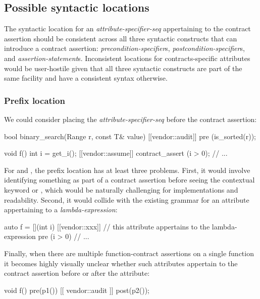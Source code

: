 \subsection{Possible syntactic locations}

The syntactic location for an \emph{attribute-specifier-seq} appertaining to the contract assertion should be consistent across all three syntactic constructs that can introduce a contract assertion: \emph{precondition-specifier}s, \emph{postcondition-specifier}s, and \emph{assertion-statement}s. Inconsistent locations for contracts-specific attributes would be user-hostile given that all three syntactic constructs are part of the same facility and have a consistent syntax otherwise.

\subsubsection{Prefix location}

We could consider placing the \emph{attribute-specifier-seq} before the contract assertion:
\begin{codeblock}
bool binary_search(Range r, const T& value)
  [[vendor::audit]] pre (is_sorted(r));  
  
void f() {
  int i = get_i();
  [[vendor::assume]] contract_assert (i > 0);
  // ...
}
\end{codeblock}

For  and , the prefix location has at least three problems. First, it would involve identifying something as part of a
contract assertion before seeing the contextual keyword  or , which would be naturally challenging for implementations and
readability. Second, it would collide with the existing grammar for an attribute appertaining to a \emph{lambda-expression}:

\begin{codeblock}
auto f = [](int i) [[vendor::xxx]]  // this attribute appertains to the lambda-expression
  pre (i > 0) {
  // ...
}
\end{codeblock}

Finally, when there are multiple function-contract assertions on a single function it becomes highly visually unclear whether such attributes appertain to the contract assertion before or after the attribute:
\begin{codeblock}
void f() pre(p1()) [[ vendor::audit ]] post(p2()); 
\end{codeblock}

